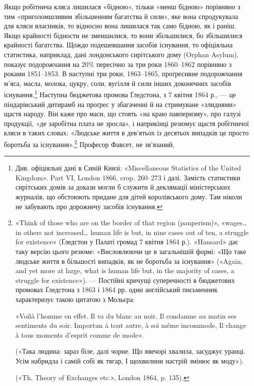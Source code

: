 Якщо робітнича кляса лишилася «бідною», тільки «менш
бідною» порівняно з тим «приголомшливим збільшенням багатства
й сили», яке вона спродукувала для кляси власників, то
відносно вона лишилася так само бідною, як і раніш. Якщо
крайності бідности не зменшилися, то вони збільшилися, бо
збільшилися крайності багатства. Щождо подешевшання засобів
існування, то офіціяльна статистика, наприклад, дані лондонського
сирітського дому (Orphan Asylum), показує подорожчання
на 20\% пересічно за три роки 1860--1862 порівняно з роками
1851--1853. В наступні три роки, 1863--1865, проґресивне
подорожчання м’яса, масла, молока, цукру, соли, вугілля й
сили інших доконечних засобів існування.\footnote{
Див. офіціяльні дані в Синій Книзі: «Miscellaneous Statistics
of the United Kingdom». Part VI, London 1866, crop. 260--273 і далі.
Замість статистики сирітських домів за докази могли б служити й деклямації
міністерських журналів, що обстоюють придане для дітей королівського
дому. Там ніколи не забувають про дорожнечу засобів існування.
} Наступна бюджетова
промова Ґледстона, з 7 квітня 1864 р., — це піндарівський
дитирамб на проґрес у збагаченні й на стримуване «злиднями»
щастя народу. Він каже про маси, що стоять «на краю
павперизму», про галузі продукції, «де заробітна плата не
зросла», і наприкінці резюмує щастя робітничої кляси в таких
словах: «Людське життя в дев’ятьох із десятьох випадків це
просто боротьба за існування».\footnote{
«Think of those who are on the border of that region (pauperism)»,
«wages\dots{} in others not increased\dots{} human life is but, in nine cases out of ten,
a struggle for existence» (Ґледстон у Палаті громад 7 квітня 1864 р.).
«Hansard» дає таку версію цього резюме: «Висловлюючи це в загальнішій
формі: «Що таке людське життя в більшості випадків, як не боротьба
за існування» («Again, and yet more at large, what is human life but,
in the majority of cases, a struggle for existence»). — Постійні кричущі суперечності
в бюджетових промовах Ґледстона з 1863 і 1864 рр. один англійський
письменник характеризує такою цитатою з Мольєра:

«Voilà l’homme en effet. Il va du blanc au noir.
Il condamne au matin ses sentiments du soir.
Importun à tout autre, à soi même incommode,
Il change à tous moments d’esprit comme de mode».

(«Така людина: зараз біле, далі чорне.
Що ввечорі хвалила, засуджує уранці.
Усім набридла і самій собі як тягар,
І щохвилини настрій змінює як моду»).

(«Th. Theory of Exchanges etc.»,
London 1864, p. 135).
} Професор Фавсет, не зв’язаний,
